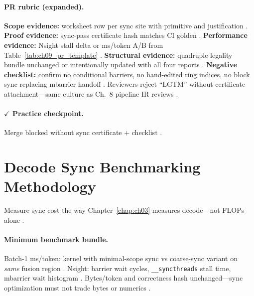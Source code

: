 \paragraph{PR rubric (expanded).}
\textbf{Scope evidence:} worksheet row per sync site with primitive and justification \citep{yirage2026,chen2020compilerbasedhardw}.
\textbf{Proof evidence:} sync-pass certificate hash matches CI golden \citep{wu2024mirage,mpk2025}.
\textbf{Performance evidence:} Nsight stall delta or ms/token A/B from Table~\ref{tab:ch09_pr_template} \citep{patel2025llminference,shah2024flashattention3}.
\textbf{Structural evidence:} quadruple legality bundle unchanged or intentionally updated with all four reports \citep{taxbreak2026,dao2022flashattention}.
\textbf{Negative checklist:} confirm no conditional barriers, no hand-edited ring indices, no block sync replacing mbarrier handoff \citep{semianalysis2024tma,nvidia2022hopper}.
Reviewers reject ``LGTM'' without certificate attachment---same culture as Ch.~8 pipeline IR reviews \citep{yirage2026,taxbreak2026}.

\paragraph{$\checkmark$ Practice checkpoint.}
Merge blocked without sync certificate + checklist \citep{yirage2026,chen2020compilerbasedhardw,taxbreak2026}.

\section{Decode Sync Benchmarking Methodology}
\label{sec:ch09_sync_benchmarking}

Measure sync cost the way Chapter~\ref{chap:ch03} measures decode---not FLOPs alone \citep{patel2025llminference,taxbreak2026,yirage2026}.

\paragraph{Minimum benchmark bundle.}
Batch-1 ms/token: kernel with minimal-scope sync vs coarse-sync variant on \emph{same} fusion region \citep{shah2024flashattention3,memoryfloor2026,dao2022flashattention}.
Nsight: barrier wait cycles, \texttt{\_\_syncthreads} stall time, mbarrier wait histogram \citep{nvidia2022hopper,semianalysis2024tma,patel2025llminference}.
Bytes/token and correctness hash unchanged---sync optimization must not trade bytes or numerics \citep{taxbreak2026,chen2020compilerbasedhardw,yirage2026}.

